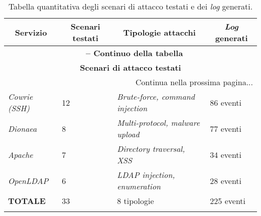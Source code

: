 \begin{center}
\begin{longtable}{|p{}|p{}|p{}|p{}|}
\hline
\multicolumn{1}{|c|}{\textbf{Servizio}} & 
\multicolumn{1}{c|}{\textbf{Scenari testati}} & 
\multicolumn{1}{c|}{\textbf{Tipologie attacchi}} & 
\multicolumn{1}{c|}{\textbf{\textit{Log} generati}} \\ 
\hline
\endfirsthead

\multicolumn{4}{c}{{\bfseries \tablename\ \thetable{} -- Continuo della tabella}}\\
\hline
\multicolumn{4}{|c|}{\textbf{Scenari di attacco testati}} \\ \hline
\endhead

\hline \multicolumn{4}{|r|}{{Continua nella prossima pagina...}} \\ \hline
\endfoot

\endlastfoot

\textit{Cowrie (SSH)} & 12 & \textit{Brute-force, command injection} & 86 eventi \\ \hline
\textit{Dionaea} & 8 & \textit{Multi-protocol, malware upload} & 77 eventi \\ \hline
\textit{Apache} & 7 & \textit{Directory traversal, XSS} & 34 eventi \\ \hline
\textit{OpenLDAP} & 6 & \textit{LDAP injection, enumeration} & 28 eventi \\ \hline
\textbf{TOTALE} & 33 & 8 tipologie & 225 eventi \\ \hline

\caption{Tabella quantitativa degli scenari di attacco testati e dei \textit{log} generati.}
\label{tab:scenari-attacco}
\end{longtable}
\end{center}


